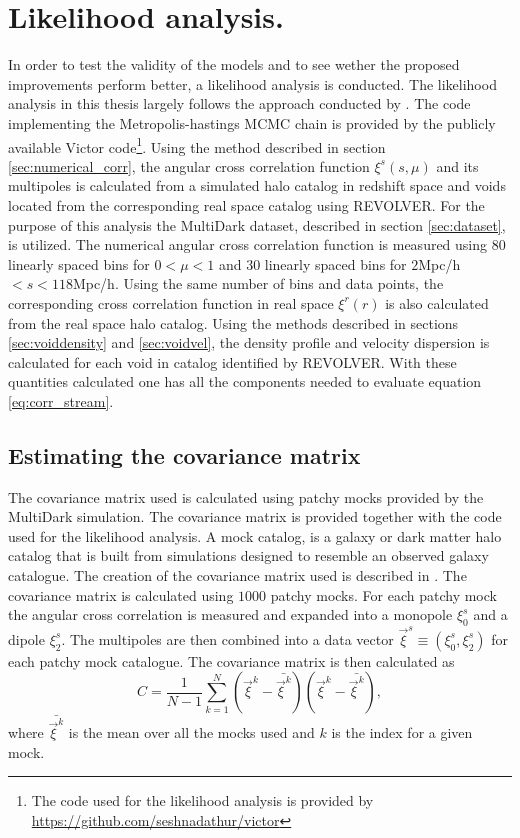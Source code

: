 \section{Likelihood analysis.}\label{sec:maximum_likelihood_method}
In order to test the validity of the models and to see wether the proposed improvements perform better, a likelihood analysis is conducted. The likelihood analysis in this thesis largely follows the approach conducted by \cite{BeyondBAO}. The code implementing the Metropolis-hastings MCMC chain is provided by the publicly available Victor code\footnote{The code used for the likelihood analysis is provided by \url{https://github.com/seshnadathur/victor}}. Using the method described in section \ref{sec:numerical_corr}, the angular cross correlation function $\xi^s(s,\mu)$ and its multipoles is calculated from a simulated halo catalog in redshift space and voids located from the corresponding real space catalog using REVOLVER. For the purpose of this analysis the MultiDark dataset, described in section \ref{sec:dataset}, is utilized. The numerical angular cross correlation function  is measured using $80$ linearly spaced bins for $0<\mu<1$ and $30$ linearly spaced bins for $2$Mpc/h$<s<118$Mpc/h. Using the same number of bins and data points, the corresponding cross correlation function in real space $\xi^r(r)$ is also calculated from the real space halo catalog. Using the methods described in sections \ref{sec:voiddensity} and \ref{sec:voidvel}, the density profile and velocity dispersion is calculated for each void in catalog identified by REVOLVER. With these quantities calculated one has all the components needed to evaluate equation \ref{eq:corr_stream}.
\subsection{Estimating the covariance matrix}
The covariance matrix used is calculated using patchy mocks provided by the MultiDark simulation\cite{MDmock1}\cite{MDmock2}. The covariance matrix is provided together with the code used for the likelihood analysis. A mock catalog, is a galaxy or dark matter halo catalog that is built from simulations designed to resemble an observed galaxy catalogue. The creation of the covariance matrix used is described in \cite{BeyondBAO}. The covariance matrix is calculated using $1000$ patchy mocks. For each patchy mock the angular cross correlation is measured and expanded into a monopole $\xi_0^s$ and a dipole $\xi_2^s$. The multipoles are then combined into a data vector $\vec{\xi}^s\equiv(\xi_0^s, \xi_2^s)$ for each patchy mock catalogue. The covariance matrix is then calculated as
\begin{equation}
    C=\frac{1}{N-1}\sum_{k=1}^N(\vec{\xi} ^k-\bar{\vec{\xi}^k})(\vec{\xi}^k-\bar{\vec{\xi}^k}),
\end{equation} 
where $\bar{\vec{\xi}^k}$ is the mean over all the mocks used and $k$ is the index for a given mock.

